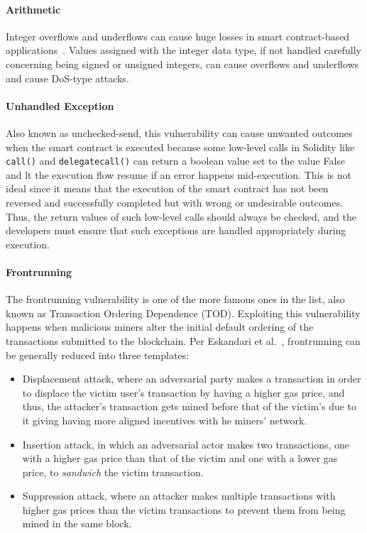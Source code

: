            \paragraph{Arithmetic}
            Integer overflows and underflows can cause huge losses in smart contract-based applications~\cite{arithmeticVuln}.
            Values assigned with the integer data type, if not handled carefully concerning being signed or unsigned integers, can cause overflows and underflows and cause DoS-type attacks.
            
            \paragraph{Unhandled Exception}
            Also known as unchecked-send, this vulnerability can cause unwanted outcomes when the smart contract is executed because some low-level calls in Solidity like \texttt{call()} and \texttt{delegatecall()} can return a boolean value set to the value False and lt the execution flow resume if an error happens mid-execution.
            This is not ideal since it means that the execution of the smart contract has not been reversed and successfully completed but with wrong or undesirable outcomes.
            Thus, the return values of such low-level calls should always be checked, and the developers must ensure that such exceptions are handled appropriately during execution.
            
            \paragraph{Frontrunning}
            The frontrunning vulnerability is one of the more famous ones in the list, also known as Transaction Ordering Dependence (TOD).
            Exploiting this vulnerability happens when malicious miners alter the initial default ordering of the transactions submitted to the blockchain.
            Per Eskandari et al.~\cite{eskandari2018frontrunning}, frontrunning can be generally reduced into three templates:
            \begin{itemize}
                \item Displacement attack, where an adversarial party makes a transaction in order to displace the victim user's transaction by having a higher gas price, and thus, the attacker's transaction gets mined before that of the victim's due to it giving having more aligned incentives with he miners' network.
                \item Insertion attack, in which an adversarial actor makes two transactions, one with a higher gas price than that of the victim and one with a lower gas price, to \textit{sandwich} the victim transaction.~\cite{varun2022mitigating}
                \item Suppression attack, where an attacker makes multiple transactions with higher gas prices than the victim transactions to prevent them from being mined in the same block.
            \end{itemize}

